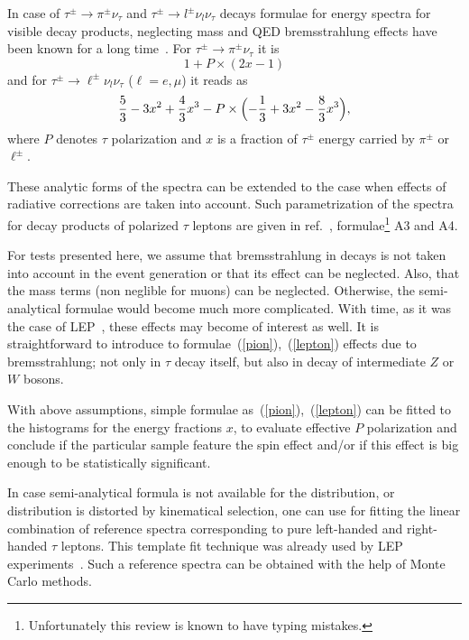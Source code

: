 \documentclass{article}
\begin{document}
In case of $\tau^\pm \to \pi^\pm \nu_\tau$ and $\tau^\pm \to l^\pm\nu_l\nu_\tau$ decays 
formulae for energy spectra
for visible decay products, neglecting mass and QED bremsstrahlung effects have been known for a long time~\cite{jadach-was:1984}.
For $\tau^\pm \to \pi^\pm \nu_\tau$ it is
\begin{equation}
1 +P \times (2x-1) \label{pion}
\end{equation}
and for $\tau^\pm \to \ell^\pm\nu_l\nu_\tau$ ($ \ell = e, \mu$) it reads as
\begin{equation}
\frac{5}{3} -3x^2+\frac{4}{3}x^3
-P \times \Bigl(-\frac{1}{3}+3x^2-\frac{8}{3}x^3\Bigr),\label{lepton}
\end{equation}
where $P$ denotes $\tau$ polarization and $x$ is a fraction of $\tau^\pm$ 
energy carried by $\pi^\pm$ or $\ell^\pm$.


These analytic forms of the spectra can be extended to the case when effects 
of radiative corrections are 
taken into account. Such parametrization of the 
 spectra for decay products of polarized $\tau$ leptons are given in ref.~\cite{Eberhard:1989ve},
formulae\footnote{Unfortunately 
this review is known to have typing mistakes.} A3 and A4.


For tests presented here, we assume that bremsstrahlung in decays is not taken into 
account in the event generation or that its effect can be neglected. Also, that the mass terms (non neglible for muons) can be neglected.
Otherwise, the semi-analytical formulae would become much more complicated.
With time, as it was the case of LEP~\cite{Heister:2001uh}, these effects may become of interest as well. It is straightforward 
to introduce to formulae~(\ref{pion}),~(\ref{lepton}) effects due to bremsstrahlung; not only in $\tau$ decay itself, but also in decay 
of intermediate $Z$ or $W$ bosons. 

With above assumptions, simple formulae as~(\ref{pion}),~(\ref{lepton}) can be fitted to the histograms
for the energy  fractions $x$,
  to evaluate effective $P$ polarization and conclude if  the particular sample feature the spin effect 
and/or if this effect is 
big enough to be  statistically
significant. 

In case semi-analytical formula is not available for the distribution, or distribution is distorted by kinematical selection, 
one can use for fitting the linear combination of reference spectra corresponding to pure left-handed
 and right-handed $\tau$ leptons.
This  template fit technique was already used by LEP experiments~\cite{Heister:2001uh}. Such a reference spectra
can be  obtained with the help of Monte Carlo methods.
\end{document}

